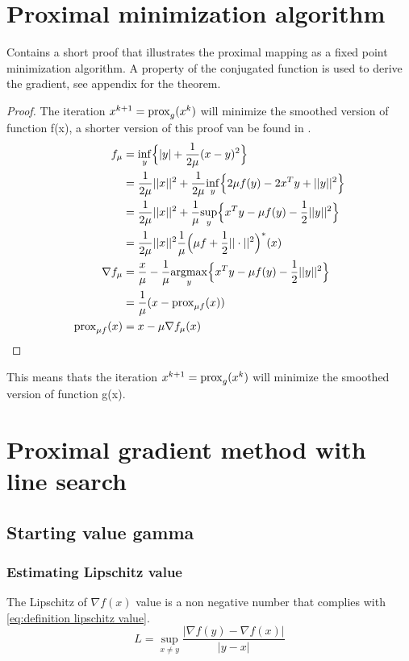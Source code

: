 	\section{Proximal minimization algorithm}
		 \cite{QianYang} Contains a short proof that illustrates the proximal mapping as a fixed point minimization algorithm. A property of the conjugated function is used to derive the gradient, see appendix for the theorem.
		 \begin{proof}
		 	The iteration $x^{k+1}=\operatorname{prox}_g(x^k)$ will minimize the smoothed version of function f(x), a shorter version of this proof van be found in \cite{QianYang}. 
		 	\begin{align*}
		 	f_{\mu}
		 	&= \underset{y}{\inf}\Big\{ |y| +\frac{1}{2 \mu}(x-y)^2 \Big\} \\
		 	&=   \frac{1}{2 \mu}||x||^2 + \frac{1}{2\mu} 
		 	\underset{y}{\inf}\Big\{
		 	2 \mu f(y) - 2x^T y + ||y||^2
		 	\Big\} \\
		 	&=  \frac{1}{2 \mu}||x||^2 + \frac{1}{\mu} 
		 	\underset{y}{\sup}\Big\{
		 	x^T y  - \mu f(y) - \frac{1}{2} ||y||^2 \Big \} \\
		 	&= \frac{1}{2\mu }||x||^2 \frac{1}{\mu } \Big( \mu f + \frac{1}{2}||\cdot||^2 \Big)^* (x) \\
		 	\nabla  f_{\mu} 
		 	&= \frac{x}{\mu} - \frac{1}{\mu} \underset{y}{\operatorname{argmax}} 
		 	\Big \{ x^Ty - \mu f(y) - \frac{1}{2}||y||^2 \Big \}\\
		 	& = \frac{1}{\mu}(x - \operatorname{prox}_{\mu f}(x)) \\
		 	\operatorname{prox}_{\mu f}(x)
		 	& = x- \mu \nabla f_{\mu}(x)
		 	\end{align*}
		 	\label{prf:proximal minimiztion alg proof}
		 \end{proof}

		 This means thats the iteration $x^{k+1}=\operatorname{prox}_g(x^k)$ will minimize the smoothed version of function g(x). 

\section{Proximal gradient method with line search}
	\subsection{Starting value gamma }
		\subsubsection{Estimating Lipschitz value}
			The Lipschitz of $\nabla f(x)$ value is a non negative number that complies with \eqref{eq:definition lipschitz value}.
			\begin{equation}
			L = \underset{x \neq y}{\sup} \frac{|\nabla f(y)-\nabla f(x)|}{|y-x|}
			\label{eq:definition lipschitz value}
			\end{equation}
			
